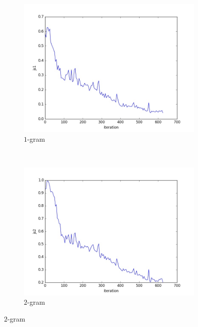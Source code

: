 \documentclass[10pt,a4paper]{article}
\begin{document}
\begin{figure}[H]
    \centering
    \begin{subfigure}[b]{0.4\textwidth}
        \includegraphics[width=\textwidth]{romeo/js1}
        \caption{$1$-gram}
    \end{subfigure}
    ~ 
    \begin{subfigure}[b]{0.4\textwidth}
        \includegraphics[width=\textwidth]{romeo/js2}
        \caption{$2$-gram}
    \end{subfigure}
    

\end{figure}
\end{document}
